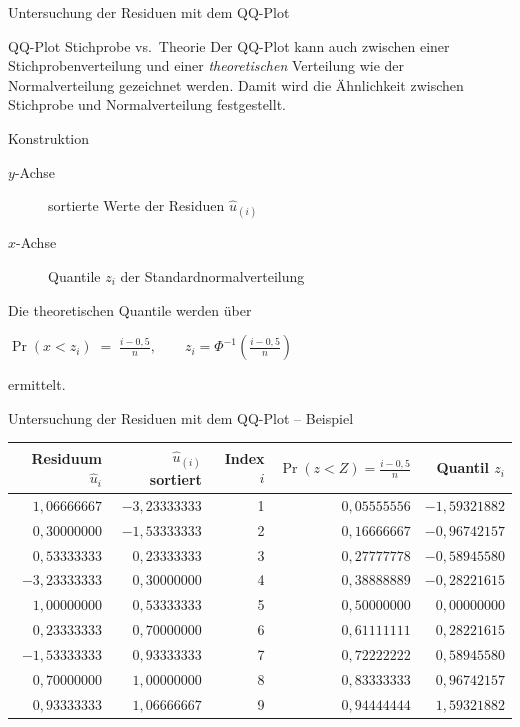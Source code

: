 \documentclass[aspectratio=169,11pt]{beamer}
\begin{document}
\begin{frame}{Untersuchung der Residuen mit dem QQ-Plot}
  \begin{block}{QQ-Plot Stichprobe vs.\ Theorie}
    Der QQ-Plot kann auch zwischen einer Stichprobenverteilung und
    einer \emph{theoretischen} Verteilung wie der Normalverteilung
    gezeichnet werden. Damit wird die Ähnlichkeit zwischen
    Stichprobe und Normalverteilung festgestellt.
  \end{block}

  \begin{block}{Konstruktion}
    \begin{description}
      \item[$y$-Achse] sortierte Werte der Residuen $\hat{u}_{(i)}$
      \item[$x$-Achse] Quantile $z_i$ der Standardnormalverteilung
    \end{description}
    Die theoretischen Quantile werden über
    \begin{center}
      $\displaystyle
        \Pr(x < z_i) \;=\; \frac{i - 0{,}5}{n},
        \qquad z_i = \Phi^{-1}\!\left(\tfrac{i-0{,}5}{n}\right)
      $
    \end{center}
    ermittelt.
  \end{block}
\end{frame}

\begin{frame}{Untersuchung der Residuen mit dem QQ-Plot -- Beispiel}
  \begin{center}
    \small
    \begin{tabular}{rrrrr}
      \toprule
      \textbf{Residuum $\hat{u}_i$} & \textbf{$\hat{u}_{(i)}$ sortiert} & \textbf{Index $i$} & \textbf{$\Pr(z<Z) = \tfrac{i-0{,}5}{n}$} & \textbf{Quantil $z_i$} \\
      \midrule
       $1{,}06666667$ & $-3{,}23333333$ & 1 & $0{,}05555556$ & $-1{,}59321882$ \\
       $0{,}30000000$ & $-1{,}53333333$ & 2 & $0{,}16666667$ & $-0{,}96742157$ \\
       $0{,}53333333$ &  $0{,}23333333$ & 3 & $0{,}27777778$ & $-0{,}58945580$ \\
      $-3{,}23333333$ &  $0{,}30000000$ & 4 & $0{,}38888889$ & $-0{,}28221615$ \\
       $1{,}00000000$ &  $0{,}53333333$ & 5 & $0{,}50000000$ &  $0{,}00000000$ \\
       $0{,}23333333$ &  $0{,}70000000$ & 6 & $0{,}61111111$ &  $0{,}28221615$ \\
      $-1{,}53333333$ &  $0{,}93333333$ & 7 & $0{,}72222222$ &  $0{,}58945580$ \\
       $0{,}70000000$ &  $1{,}00000000$ & 8 & $0{,}83333333$ &  $0{,}96742157$ \\
       $0{,}93333333$ &  $1{,}06666667$ & 9 & $0{,}94444444$ &  $1{,}59321882$ \\
      \bottomrule
    \end{tabular}
  \end{center}
\end{frame}
\end{document}
